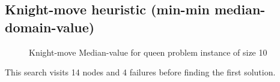 \documentclass[a4paper, 11pt]{article}
\begin{document}
\subsection*{Knight-move heuristic (min-min median-domain-value)}
\begin{figure}[H]
  \begin{center}
    \caption{Knight-move Median-value for queen problem instance of size 10}
    \label{fig:kmm10}
  \end{center}
\end{figure}
This search visits 14 nodes and 4 failures before finding the first solution.
\end{document}

